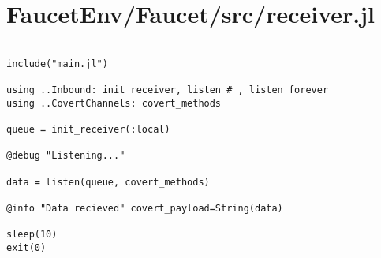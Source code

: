 \section{FaucetEnv/Faucet/src/receiver.jl}
\begin{lstlisting}[language=JuliaLocal, style=julia]

include("main.jl")

using ..Inbound: init_receiver, listen # , listen_forever
using ..CovertChannels: covert_methods

queue = init_receiver(:local)

@debug "Listening..."

data = listen(queue, covert_methods)

@info "Data recieved" covert_payload=String(data)

sleep(10)
exit(0)

\end{lstlisting}
